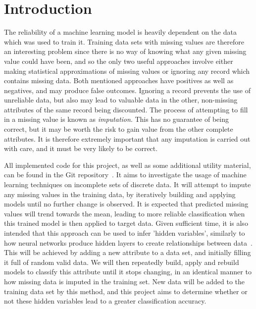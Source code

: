 \newpage
\chapter{Introduction}\label{intro}
The reliability of a machine learning model is heavily dependent on the data which was used to train it. Training data sets with missing values are therefore an interesting problem since there is no way of knowing what any given missing value could have been, and so the only two useful approaches involve either making statistical approximations of missing values or ignoring any record which contains missing data. Both mentioned approaches have positives as well as negatives, and may produce false outcomes. Ignoring a record prevents the use of unreliable data, but also may lead to valuable data in the other, non-missing attributes of the same record being discounted. The process of attempting to fill in a missing value is known as \textit{imputation}. This has no guarantee of being correct, but it may be worth the risk to gain value from the other complete attributes.  It is therefore extremely important that any imputation is carried out with care, and it must be very likely to be correct.

All implemented code for this project, as well as some additional utility material, can be found in the Git repository~\cite{gitlab}. It aims to investigate the usage of machine learning techniques on incomplete sets of discrete data. It will attempt to impute any missing values in the training data, by iteratively building and applying models until no further change is observed. It is expected that predicted missing values will trend towards the mean, leading to more reliable classification when this trained model is then applied to target data.  Given sufficient time, it is also intended that this approach can be used to infer 'hidden variables', similarly to how neural networks produce hidden layers to create relationships between data~\cite{Touretzky:1989}. This will be achieved by adding a new attribute to a data set, and initially filling it full of random valid data. We will then repeatedly build, apply and rebuild models to classify this attribute until it stops changing, in an identical manner to how missing data is imputed in the training set. New data will be added to the training data set by this method, and this project aims to determine whether or not these hidden variables lead to a greater classification accuracy. 
